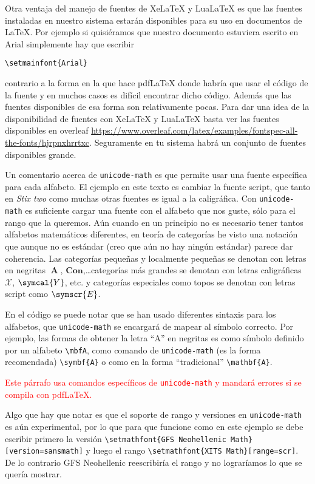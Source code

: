 Otra ventaja del manejo de fuentes de Xe\LaTeX{} y Lua\LaTeX{} es que las
fuentes instaladas en nuestro sistema estarán disponibles para su uso en
documentos de \LaTeX{}. Por ejemplo si quisiéramos que nuestro documento
estuviera escrito en Arial simplemente hay que escribir
\begin{flushleft}
  \verb|\setmainfont{Arial}|
\end{flushleft}
contrario a la forma en la que hace pdf\LaTeX{} donde habría que usar el
código de la fuente y en muchos casos es difícil encontrar dicho código.
Además que las fuentes disponibles de esa forma son relativamente pocas.
Para dar una idea de la disponibilidad de fuentes con Xe\LaTeX{} y
Lua\LaTeX{} basta ver las fuentes disponibles en overleaf \url{https://www.overleaf.com/latex/examples/fontspec-all-the-fonts/hjrpnxhrrtxc}.
Seguramente en tu sistema habrá un conjunto de fuentes disponibles grande.

\ifluatex%
Un comentario acerca de \texttt{unicode-math} es que permite usar una
fuente específica para cada alfabeto. El ejemplo en este texto es cambiar la
fuente script, que tanto en \textit{Stix two} como muchas otras fuentes es
igual a la caligráfica. Con \texttt{unicode-math} es suficiente cargar una
fuente con el alfabeto que nos guste, sólo para el rango que la queremos.
Aún cuando en un principio no es necesario tener tantos alfabetos matemáticos
diferentes, en teoría de categorías he visto una notación que aunque no es
estándar (creo que aún no hay ningún estándar) parece dar coherencia. Las
categorías pequeñas y localmente pequeñas se denotan con letras en negritas
\(\mbfA \), \(\symbf{Con}\),\ldots categorías más grandes se denotan con
letras caligráficas \(\mathcal{X}\), \(\symcal{Y}\), etc. y categorías
especiales como topos se denotan con letras script como \(\symscr{E}\).

En el código se puede notar que se han usado diferentes sintaxis para los
alfabetos, que \texttt{unicode-math} se encargará de mapear al símbolo
correcto. Por ejemplo, las formas de obtener la letra \enquote{A} en negritas es
como símbolo definido por un alfabeto \verb|\mbfA|, como comando de
\texttt{unicode-math} (es la forma recomendada) \verb|\symbf{A}| o como en
la forma \enquote{tradicional} \verb|\mathbf{A}|.
\ifpdftex%
\begin{center}
  \textcolor{red}{Este párrafo usa comandos específicos de \texttt{unicode-math} y mandará errores si se compila con pdf\LaTeX.}
\end{center}
\fi
\fi

Algo que hay que notar es que el soporte de rango y versiones en
\texttt{unicode-math} es aún experimental, por lo que para que funcione como
en este ejemplo se debe escribir primero la versión
\verb|\setmathfont{GFS Neohellenic Math}[version=sansmath]|
y luego el rango \verb|\setmathfont{XITS Math}[range=scr]|. De lo contrario
GFS Neohellenic reescribiría el rango y no lograríamos lo que se quería
mostrar.
